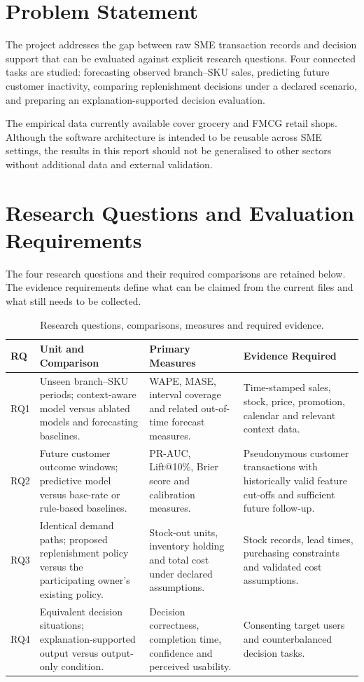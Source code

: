 \section{Problem Statement}
The project addresses the gap between raw SME transaction records and decision support that can be evaluated against explicit research questions. Four connected tasks are studied: forecasting observed branch--SKU sales, predicting future customer inactivity, comparing replenishment decisions under a declared scenario, and preparing an explanation-supported decision evaluation.

The empirical data currently available cover grocery and FMCG retail shops. Although the software architecture is intended to be reusable across SME settings, the results in this report should not be generalised to other sectors without additional data and external validation.

\section{Research Questions and Evaluation Requirements}
The four research questions and their required comparisons are retained below. The evidence requirements define what can be claimed from the current files and what still needs to be collected.

\begin{table}[htbp]
\centering
\scriptsize
\renewcommand{\arraystretch}{1.25}
\begin{tabularx}{\textwidth}{p{0.65cm} X X X}
\toprule
\textbf{RQ} & \textbf{Unit and Comparison} & \textbf{Primary Measures} & \textbf{Evidence Required}\\
\midrule
RQ1 & Unseen branch--SKU periods; context-aware model versus ablated models and forecasting baselines. & WAPE, MASE, interval coverage and related out-of-time forecast measures. & Time-stamped sales, stock, price, promotion, calendar and relevant context data.\\
RQ2 & Future customer outcome windows; predictive model versus base-rate or rule-based baselines. & PR-AUC, Lift@10\%, Brier score and calibration measures. & Pseudonymous customer transactions with historically valid feature cut-offs and sufficient future follow-up.\\
RQ3 & Identical demand paths; proposed replenishment policy versus the participating owner's existing policy. & Stock-out units, inventory holding and total cost under declared assumptions. & Stock records, lead times, purchasing constraints and validated cost assumptions.\\
RQ4 & Equivalent decision situations; explanation-supported output versus output-only condition. & Decision correctness, completion time, confidence and perceived usability. & Consenting target users and counterbalanced decision tasks.\\
\bottomrule
\end{tabularx}
\caption{Research questions, comparisons, measures and required evidence.}
\label{tab:research_questions}
\end{table}

